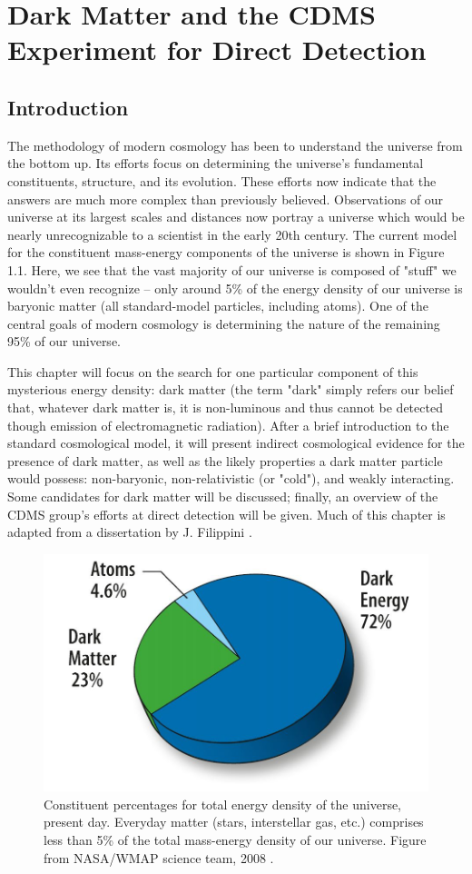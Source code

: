 \documentclass{report}
\begin{document}
\chapter{Dark Matter and the CDMS Experiment for Direct Detection}

\section{Introduction}

The methodology of modern cosmology has been to understand the universe from the bottom up. Its efforts focus on determining the universe's fundamental constituents, structure, and its evolution. These efforts now indicate that the answers are much more complex than previously believed. Observations of our universe at its largest scales and distances now portray a universe which would be nearly unrecognizable to a scientist in the early 20th century. The current model for the constituent mass-energy components of the universe is shown in Figure 1.1. Here, we see that the vast majority of our universe is composed of "stuff" we wouldn't even recognize -- only around 5\% of the energy density of our universe is baryonic matter (all standard-model particles, including atoms). One of the central goals of modern cosmology is determining the nature of the remaining 95\% of our universe.

This chapter will focus on the search for one particular component of this mysterious energy density: dark matter (the term "dark" simply refers our belief that, whatever dark matter is, it is non-luminous and thus cannot be detected though emission of electromagnetic radiation). After a brief introduction to the standard cosmological model, it will present indirect cosmological evidence for the presence of dark matter, as well as the likely properties a dark matter particle would possess: non-baryonic, non-relativistic (or "cold"), and weakly interacting. Some candidates for dark matter will be discussed; finally, an overview of the CDMS group's efforts at direct detection will be given. Much of this chapter is adapted from a dissertation by J. Filippini \cite{Filippini2008}.

\begin{figure}[h]
\centering
\includegraphics[width = .4\textwidth]{Pie_chart_universe.jpg}
\caption{Constituent percentages for total energy density of the universe, present day. Everyday matter (stars, interstellar gas, etc.) comprises less than 5\% of the total mass-energy density of our universe. Figure from NASA/WMAP science team, 2008 \cite{WMAP}.}
\end{figure}
\end{document}
